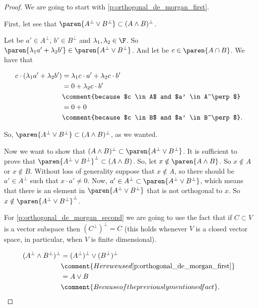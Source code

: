 \begin{proof}
    We are going to start with \eqref{p:orthogonal_de_morgan_first}.\pn
    
    First, let see that $\paren{A^\perp \vee B^\perp} \subset (A \wedge B)^\perp$.\pn
    
    Let be $a' \in A^\perp$, $b' \in B^\perp$ and $\lambda_1,\lambda_2 \in \F$. So $\paren{\lambda_1 a' + \lambda_2 b'} \in \paren{A^\perp \vee B^\perp}$. 
    And let be $c \in \paren{A \cap B}$. We have that\pn
    
    \begin{align}
            c \cdot (\lambda_1 a' + \lambda_2 b')   &=  \lambda_1 c \cdot a' + \lambda_2 c \cdot b'     \\
                                                    &=  0   +   \lambda_2 c \cdot b'                    \\
                                                    &\comment{because $c \in A$ and $a' \in A^\perp$}   \\
                                                    &=  0   +   0                                       \\
                                                    &\comment{because $c \in B$ and $a' \in B^\perp$}.   \\
    \end{align}\pn
    
    So, $\paren{A^\perp \vee B^\perp} \subset (A \wedge B)^\perp$, as we wanted.\pn
    
		Now we want to show that $(A \wedge B)^\perp \subset \paren{A^\perp \vee B^\perp}$. It is sufficient to 
		prove that $ \paren{A^\perp \vee B^\perp}^\perp \subset (A \wedge B)$. So, let $x \notin \paren{ A\wedge B }$.	 So $x \notin A$ or $x \notin B$. Without loss of generality suppose that $x \notin A$, so there should be
		$a' \in A^\perp$ such that $x \cdot a' \neq 0$. Now, $a' \in A^\perp \subset \paren{A^\perp \vee B^\perp}$,
		which means that there is an element in $\paren{A^\perp \vee B^\perp}$ that is not orthogonal to $x$. So
		$x \notin \paren{A^\perp \vee B^\perp}^\perp$.\pn
		
    
    For \eqref{p:orthogonal_de_morgan_second} we are going to use the fact that if $C \subset V$ is a vector subspace then
    $(C^\perp)^\perp = C$ (this holds whenever $V$ is a closed vector space, in particular, when $V$ is finite dimensional).
    
    \begin{align}
        (A^\perp \wedge B^\perp)^\perp  &=  (A^\perp)^\perp \vee (B^\perp)^\perp                            \\
                                        &\comment{Here we used \eqref{p:orthogonal_de_morgan_first}}        \\
                                        &=  A \vee B                                                        \\
                                        &\comment{Because of the previously mentioned fact}.
    \end{align}\pn
    

\end{proof}
